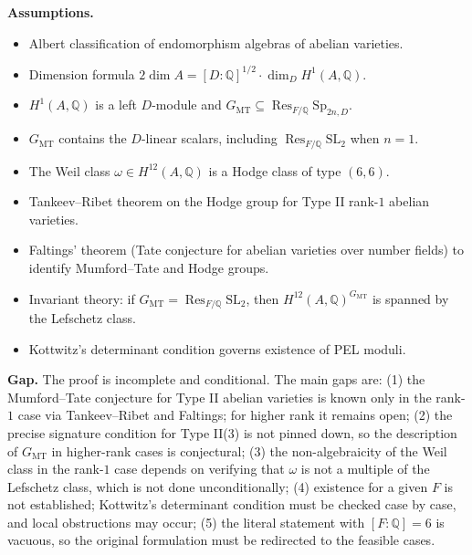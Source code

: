 \documentclass{article}
\begin{document}
\medskip
\noindent\textbf{Assumptions.}
\begin{itemize}
\item Albert classification of endomorphism algebras of abelian varieties.
\item Dimension formula $2\dim A = [D:\mathbb{Q}]^{1/2}\cdot \dim_D H^1(A,\mathbb{Q})$.
\item $H^1(A,\mathbb{Q})$ is a left $D$-module and
$G_{\mathrm{MT}} \subseteq \operatorname{Res}_{F/\mathbb{Q}} \mathrm{Sp}_{2n,D}$.
\item $G_{\mathrm{MT}}$ contains the $D$-linear scalars, including
$\operatorname{Res}_{F/\mathbb{Q}} \mathrm{SL}_2$ when $n = 1$.
\item The Weil class $\omega \in H^{12}(A,\mathbb{Q})$ is a Hodge class of type
$(6,6)$.
\item Tankeev--Ribet theorem on the Hodge group for Type II rank-$1$ abelian varieties.
\item Faltings' theorem (Tate conjecture for abelian varieties over number fields) to
identify Mumford--Tate and Hodge groups.
\item Invariant theory: if $G_{\mathrm{MT}} = \operatorname{Res}_{F/\mathbb{Q}}
\mathrm{SL}_2$, then $H^{12}(A,\mathbb{Q})^{G_{\mathrm{MT}}}$ is spanned by the
Lefschetz class.
\item Kottwitz's determinant condition governs existence of PEL moduli.
\end{itemize}

\medskip
\noindent\textbf{Gap.}
The proof is incomplete and conditional. The main gaps are:
(1) the Mumford--Tate conjecture for Type II abelian varieties is known only in the
rank-$1$ case via Tankeev--Ribet and Faltings; for higher rank it remains open;
(2) the precise signature condition for Type II(3) is not pinned down, so the
description of $G_{\mathrm{MT}}$ in higher-rank cases is conjectural;
(3) the non-algebraicity of the Weil class in the rank-$1$ case depends on verifying
that $\omega$ is not a multiple of the Lefschetz class, which is not done
unconditionally;
(4) existence for a given $F$ is not established; Kottwitz's determinant condition must
be checked case by case, and local obstructions may occur;
(5) the literal statement with $[F:\mathbb{Q}] = 6$ is vacuous, so the original
formulation must be redirected to the feasible cases.
\end{document}
